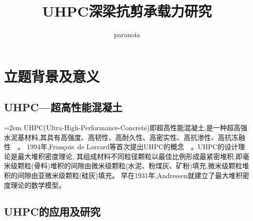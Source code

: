 \documentclass[a4paper,11pt]{article}
\title{UHPC深梁抗剪承载力研究}
\author{paranoia}
\date{}
\begin{document}

\section{立题背景及意义}

\begin{mybox}

\subsection{UHPC---超高性能混凝土}
\parindent=2em UHPC(Ultra-High-Performance-Concrete)即超高性能混凝土,是一种超高强水泥基材料,其具有高强度、高韧性、高耐久性、高密实性、高抗渗性、高抗冻融性~~\cite{阎培渝2010超高性能混凝土}。
1994年,Fran{\c{c}}ois\ de Larrard等首次提出UHPC的概念~~\cite{Sedran1994Optimization}。UHPC的设计理论是最大堆积密度理论,
其组成材料不同粒径颗粒以最佳比例形成最紧密堆积,即毫米级颗粒(骨料)堆积的间隙由微米级颗粒(水泥、粉煤灰、矿粉)填充,微米级颗粒堆积的间隙由亚微米级颗粒(硅灰)填充。
早在1931年,Andressen就建立了最大堆积密度理论的数学模型。

\subsection{UHPC的应用及研究}


\end{mybox}
\end{document}
